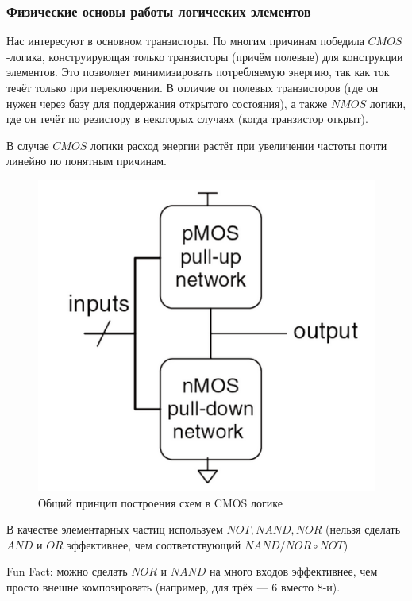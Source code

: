 \documentclass[12pt, a4paper]{article}
\begin{document}
\subsubsection{Физические основы работы логических элементов}

Нас интересуют в основном транзисторы.
По многим причинам победила $CMOS$-логика, конструирующая только транзисторы (причём полевые)
для конструкции элементов. Это позволяет минимизировать потребляемую энергию, так как ток течёт только при переключении.
В отличие от полевых транзисторов (где он нужен через базу для поддержания открытого состояния),
а также $NMOS$ логики, где он течёт по резистору в некоторых случаях (когда транзистор открыт).

В случае $CMOS$ логики расход энергии растёт при увеличении частоты почти линейно по понятным причинам.

\begin{figure}[h!]
    \centering
    \includegraphics[width=\textwidth]{images/general_cmos_element_scheme.png}
    \caption{Общий принцип построения схем в CMOS логике}
    \label{fig:cmos_general}
\end{figure}
\FloatBarrier

В качестве элементарных частиц используем $NOT, NAND, NOR$ (нельзя сделать $AND$ и $OR$ эффективнее, чем соответствующий $NAND/NOR \circ NOT$)

Fun Fact: можно сделать $NOR$ и $NAND$ на много входов эффективнее, чем просто внешне композировать (например, для трёх — 6 вместо 8-и).
\end{document}
